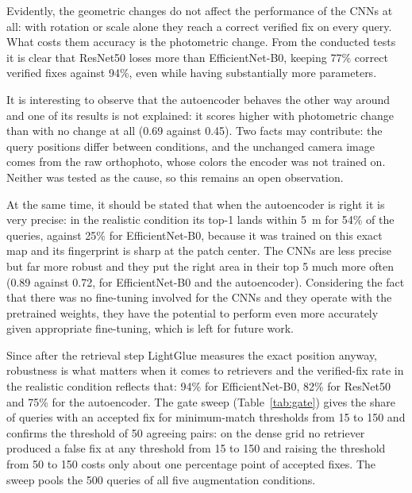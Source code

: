 \documentclass[english, Lau, oneside]{sapthesis}%
\begin{document}
Evidently, the geometric changes do not affect the performance of the CNNs at all: with rotation or scale alone they reach a correct verified fix on every query. What costs them accuracy is the photometric change. From the conducted tests it is clear that ResNet50 loses more than EfficientNet-B0, keeping 77\% correct verified fixes against 94\%, even while having substantially more parameters.

It is interesting to observe that the autoencoder behaves the other way around and one of its results is not explained: it scores higher with photometric change than with no change at all (0.69 against 0.45). Two facts may contribute: the query positions differ between conditions, and the unchanged camera image comes from the raw orthophoto, whose colors the encoder was not trained on. Neither was tested as the cause, so this remains an open observation.

At the same time, it should be stated that when the autoencoder is right it is very precise: in the realistic condition its top-1 lands within 5~m for 54\% of the queries, against 25\% for EfficientNet-B0, because it was trained on this exact map and its fingerprint is sharp at the patch center. The CNNs are less precise but far more robust and they put the right area in their top 5 much more often (0.89 against 0.72, for EfficientNet-B0 and the autoencoder). Considering the fact that there was no fine-tuning involved for the CNNs and they operate with the pretrained weights, they have the potential to perform even more accurately given appropriate fine-tuning, which is left for future work.

Since after the retrieval step LightGlue measures the exact position anyway, robustness is what matters when it comes to retrievers and the verified-fix rate in the realistic condition reflects that: 94\% for EfficientNet-B0, 82\% for ResNet50 and 75\% for the autoencoder. The gate sweep (Table~\ref{tab:gate}) gives the share of queries with an accepted fix for minimum-match thresholds from 15 to 150 and confirms the threshold of 50 agreeing pairs: on the dense grid no retriever produced a false fix at any threshold from 15 to 150 and raising the threshold from 50 to 150 costs only about one percentage point of accepted fixes. The sweep pools the 500 queries of all five augmentation conditions.
\end{document}

